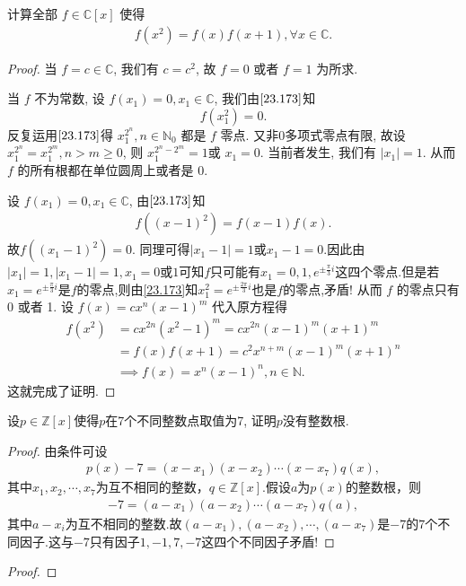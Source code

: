 \documentclass[../../main.tex]{subfiles}
\begin{document}
\begin{example}
计算全部 \( f \in \mathbb{C}[x] \) 使得
\begin{align}
f(x^2) = f(x)f(x+1), \forall x \in \mathbb{C}. \label{23.173}
\end{align}
\end{example}
\begin{proof}
当 \( f = c \in \mathbb{C} \), 我们有 \( c = c^2 \), 故 \( f = 0 \) 或者 \( f = 1 \) 为所求.

当 \( f \) 不为常数, 设 \( f(x_1) = 0, x_1 \in \mathbb{C} \), 我们由\(\eqref{23.173}\)知
\[
f(x_1^2) = 0.
\]
反复运用\(\eqref{23.173}\)得 \( x_1^{2^n}, n \in \mathbb{N}_0 \) 都是 \( f \) 零点. 又非0多项式零点有限, 故设 \( x_1^{2^n} = x_1^{2^m}, n > m \geqslant 0 \), 则 \( x_1^{2^n - 2^m} = 1 \)或 \( x_1 = 0 \). 当前者发生, 我们有 \( |x_1| = 1 \). 从而 \( f \) 的所有根都在单位圆周上或者是 0.

设 \( f(x_1) = 0, x_1 \in \mathbb{C} \), 由\(\eqref{23.173}\)知 
\begin{align*}
f((x-1)^2)=f(x-1)f(x).
\end{align*}
故\( f\left( (x_1 - 1)^2 \right) = 0 \). 同理可得\( |x_1 - 1| = 1 \)或$x_1-1=0$.因此由$|x_1|=1,|x_1-1|=1,x_1=0\text{或}1$可知$f$只可能有$x_1=0,1,e^{\pm \frac{\pi}{3}i} $这四个零点.但是若$x_1=e^{\pm \frac{\pi}{3}i}$是$f$的零点,则由\eqref{23.173}知$x_1^2=e^{\pm \frac{2\pi}{3}i}$也是$f$的零点,矛盾!
从而 \( f \) 的零点只有 0 或者 1. 设 \( f(x) = cx^n(x - 1)^m \) 代入原方程得
\begin{align*}
f(x^2) &= cx^{2n}(x^2 - 1)^m = cx^{2n}(x - 1)^m(x + 1)^m \\
&= f(x)f(x+1) = c^2x^{n+m}(x - 1)^m(x + 1)^n \\
&\implies f(x) = x^n(x - 1)^n, n \in \mathbb{N}.
\end{align*}
这就完成了证明.

\end{proof}

\begin{example}
设$ p \in \mathbb{Z}[x] $使得$ p $在7个不同整数点取值为7, 证明$ p $没有整数根.
\end{example}
\begin{proof}
由条件可设
\begin{align*}
p\left( x \right) -7=\left( x-x_1 \right) \left( x-x_2 \right) \cdots \left( x-x_7 \right) q\left( x \right),
\end{align*}
其中$x_1,x_2,\cdots,x_7$为互不相同的整数，$q\in \mathbb{Z}[x]$.假设$a$为$p\left( x \right)$的整数根，则
\begin{align*}
-7=\left( a-x_1 \right) \left( a-x_2 \right) \cdots \left( a-x_7 \right) q\left( a \right),
\end{align*}
其中$a-x_i$为互不相同的整数.故$\left( a-x_1 \right),\left( a-x_2 \right),\cdots,\left( a-x_7 \right)$是$-7$的$7$个不同因子.这与$-7$只有因子$1,-1,7,-7$这四个不同因子矛盾!

\end{proof}

\begin{example}

\end{example}
\begin{proof}


\end{proof}
\end{document}
